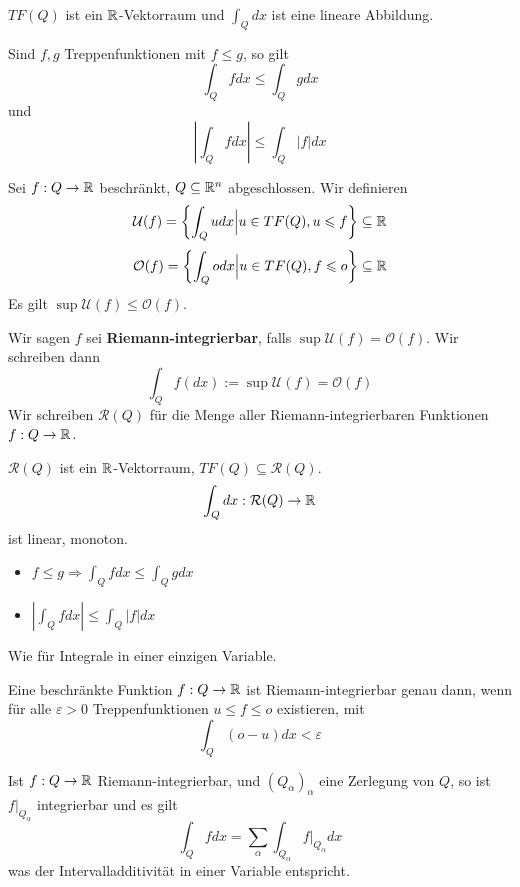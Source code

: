 \documentclass[main.tex]{subfiles}
\begin{document}
\begin{Bemerkung}
  $TF(Q)$ ist ein $\mathbb{R}$-Vektorraum und $\int_Q dx$ ist eine lineare Abbildung.

  Sind $f,g$ Treppenfunktionen mit $f \leq g$, so gilt
  $$\int_Q f dx \leq \int_Q g dx$$
  und
  $$\left|\int_Q f dx\right| \leq \int_Q |f| dx$$
\end{Bemerkung}

\begin{Definition}
  Sei $f: Q \to \mathbb{R}$ beschränkt, $Q \subseteq \mathbb{R}^n$ abgeschlossen. Wir definieren
  $$\mathcal{U}(f) = \left\{\int_Q u dx {\Big |} u \in TF(Q), u \leqslant f \right \} \subseteq \mathbb{R}$$
  $$\mathcal{O}(f) = \left\{\int_Q o dx {\Big |} u \in TF(Q), f \leqslant o \right \} \subseteq \mathbb{R}$$
  Es gilt $\sup \mathcal{U}(f) \leq \mathcal{O}(f)$.

  Wir sagen $f$ sei \textbf{Riemann-integrierbar}, falls $\sup \mathcal{U}(f) = \mathcal{O}(f)$. Wir schreiben dann
  $$\int_Q f(dx) := \sup \mathcal{U}(f) = \mathcal{O}(f)$$
  Wir schreiben $\mathcal{R}(Q)$ für die Menge aller Riemann-integrierbaren Funktionen $f: Q \to \mathbb{R}$.
\end{Definition}

\begin{Theorem}
  $\mathcal{R}(Q)$ ist ein $\mathbb{R}$-Vektorraum, $TF(Q) \subseteq \mathcal{R}(Q)$.
  $$\int_Q dx : \mathcal{R}(Q) \to \mathbb{R}$$
  ist linear, monoton.
  \begin{itemize}
    \item $f \leq g \Rightarrow \int_Q fdx \leq \int_Q g dx$
    \item $\left|\int_Q f dx\right| \leq \int_Q |f| dx$
  \end{itemize}
\end{Theorem}

\begin{Beweis}
  Wie für Integrale in einer einzigen Variable.
\end{Beweis}

\begin{Theorem}
  Eine beschränkte Funktion $f: Q \to \mathbb{R}$ ist Riemann-integrierbar genau dann, wenn für alle $\varepsilon > 0$ Treppenfunktionen $u \leq f \leq o$ existieren, mit
  $$\int_Q (o - u)dx < \varepsilon$$
\end{Theorem}

\begin{Bemerkung}
  Ist $f: Q \to \mathbb{R}$ Riemann-integrierbar, und $(Q_\alpha)_\alpha$ eine Zerlegung von $Q$, so ist $f|_{Q_\alpha}$ integrierbar und es gilt
  $$\int_Q f dx = \sum \limits_\alpha \int_{Q_\alpha} f|_{Q_\alpha} dx$$
  was der Intervalladditivität in einer Variable entspricht.
\end{Bemerkung}
\end{document}
